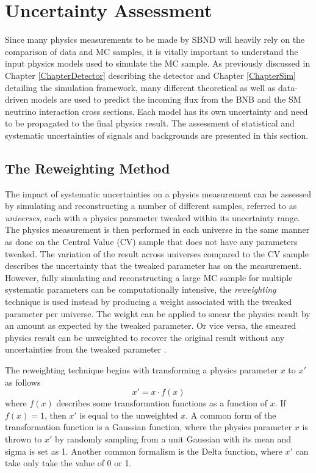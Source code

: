 \section{Uncertainty Assessment}
\label{sec:uncertainty}
Since many physics measurements to be made by SBND will heavily rely on the comparison of data and MC samples, it is vitally important to understand the input physics models used to simulate the MC sample.
As previously discussed in Chapter \ref{ChapterDetector} describing the detector and Chapter \ref{ChapterSim} detailing the simulation framework, many different theoretical as well as data-driven models are used to predict the incoming flux from the BNB and the SM neutrino interaction cross sections.
Each model has its own uncertainty and need to be propagated to the final physics result. 
The assessment of statistical and systematic uncertainties of signals and backgrounds are presented in this section.


\subsection{The Reweighting Method}
\label{sec:reweighting}

The impact of systematic uncertainties on a physics measurement can be assessed by simulating and reconstructing a number of different samples, referred to as \textit{universes}, each with a physics parameter tweaked within its uncertainty range.
The physics measurement is then performed in each universe in the same manner as done on the Central Value (CV) sample that does not have any parameters tweaked.
The variation of the result across universes compared to the CV sample describes the uncertainty that the tweaked parameter has on the measurement.
However, fully simulating and reconstructing a large MC sample for multiple systematic parameters can be computationally intensive, the \textit{reweighting} technique is used instead by producing a weight associated with the tweaked parameter per universe.
The weight can be applied to smear the physics result by an amount as expected by the tweaked parameter.
Or vice versa, the smeared physics result can be unweighted to recover the original result without any uncertainties from the tweaked parameter \cite{cowan_stat}.

The reweighting technique begins with transforming a physics parameter $x$ to $x'$ as follows
\begin{equation}
	x' = x \cdot f(x)
\end{equation}
where $f(x)$ describes some transformation functions as a function of $x$. 
If $f(x) = 1$, then $x'$ is equal to the unweighted $x$.
A common form of the transformation function  is a Gaussian function, where the physics parameter $x$ is thrown to $x'$ by randomly sampling from a unit Gaussian with its mean and sigma is set as 1.
Another common formalism is the Delta function, where $x'$ can take only take the value of 0 or 1. 

